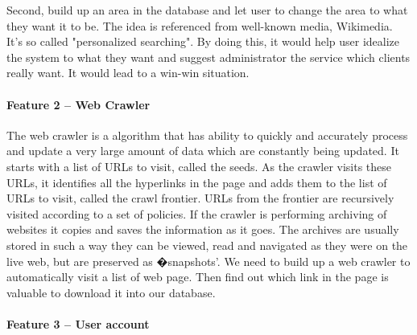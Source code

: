 Second, build up an area in the database and let user to change the area to what they want it to be. The idea is referenced from well-known media, Wikimedia. It's so called "personalized searching". By doing this, it would help user idealize the system to what they want and suggest administrator the service which clients really want. It would lead to a win-win situation.
	
\paragraph*{Feature 2 -- Web Crawler}
\label{task1:feature2}
	
The web crawler is a algorithm that has ability to quickly and accurately process and update a very large amount of data which are constantly being updated.\cite{Liu2012} It starts with a list of URLs to visit, called the seeds. As the crawler visits these URLs, it identifies all the hyperlinks in the page and adds them to the list of URLs to visit, called the crawl frontier. URLs from the frontier are recursively visited according to a set of policies. If the crawler is performing archiving of websites it copies and saves the information as it goes. The archives are usually stored in such a way they can be viewed, read and navigated as they were on the live web, but are preserved as �snapshots'.\cite{Du2013} We need to build up a web crawler to automatically visit a list of web page. Then find out which link in the page is valuable to download it into our database. 
	
\paragraph*{Feature 3 -- User account}
\label{task1:feature3}
	
